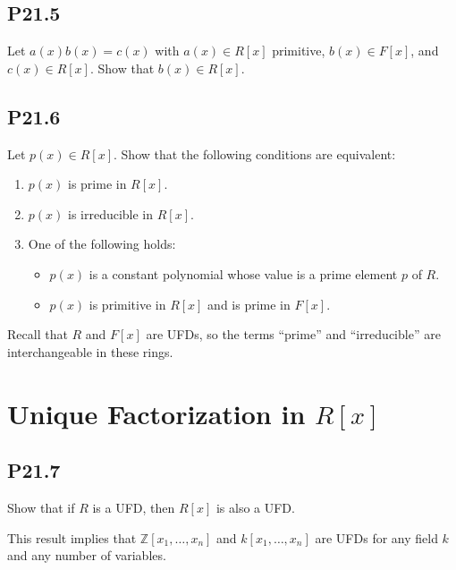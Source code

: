 \documentclass[lang=cn,11pt]{template}
\begin{document}
\subsection*{P21.5} Let \( a(x) b(x) = c(x) \) with \( a(x) \in R[x] \) primitive, \( b(x) \in F[x] \), and \( c(x) \in R[x] \). Show that \( b(x) \in R[x] \).

\subsection*{P21.6} Let \( p(x) \in R[x] \). Show that the following conditions are equivalent:
\begin{enumerate}
    \item \( p(x) \) is prime in \( R[x] \).
    \item \( p(x) \) is irreducible in \( R[x] \).
    \item One of the following holds:
    \begin{itemize}
        \item \( p(x) \) is a constant polynomial whose value is a prime element \( p \) of \( R \).
        \item \( p(x) \) is primitive in \( R[x] \) and is prime in \( F[x] \).
    \end{itemize}
\end{enumerate}

\begin{remark}
Recall that \( R \) and \( F[x] \) are UFDs, so the terms “prime” and “irreducible” are interchangeable in these rings.
\end{remark}

\section{Unique Factorization in \( R[x] \)}

\subsection*{P21.7} Show that if \( R \) is a UFD, then \( R[x] \) is also a UFD.

\begin{remark}
This result implies that \( \mathbb{Z}[x_1, \dots, x_n] \) and \( k[x_1, \dots, x_n] \) are UFDs for any field \( k \) and any number of variables.
\end{remark}
\end{document}
